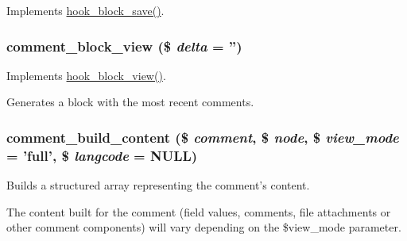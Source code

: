 \label{comment_8module_a565b5b4ebd9bb223e1e51ea00716b904}
Implements \hyperlink{group__hooks_ga622024ce4f818c241ca7a765e829f928}{hook\_\-block\_\-save()}. \hypertarget{comment_8module_a2087016cf9189eaf4d5563a08ce6a3ac}{
\subsubsection[{comment\_\-block\_\-view}]{\setlength{\rightskip}{0pt plus 5cm}comment\_\-block\_\-view (\$ {\em delta} = {\ttfamily ''})}}
\label{comment_8module_a2087016cf9189eaf4d5563a08ce6a3ac}
Implements \hyperlink{group__hooks_gaa14092a3e74cdc57aa295100cfd6860d}{hook\_\-block\_\-view()}.

Generates a block with the most recent comments. \hypertarget{comment_8module_a1ce48571361156189d7ce6f90c9465f8}{
\subsubsection[{comment\_\-build\_\-content}]{\setlength{\rightskip}{0pt plus 5cm}comment\_\-build\_\-content (\$ {\em comment}, \/  \$ {\em node}, \/  \$ {\em view\_\-mode} = {\ttfamily 'full'}, \/  \$ {\em langcode} = {\ttfamily NULL})}}
\label{comment_8module_a1ce48571361156189d7ce6f90c9465f8}
Builds a structured array representing the comment's content.

The content built for the comment (field values, comments, file attachments or other comment components) will vary depending on the \$view\_\-mode parameter.


